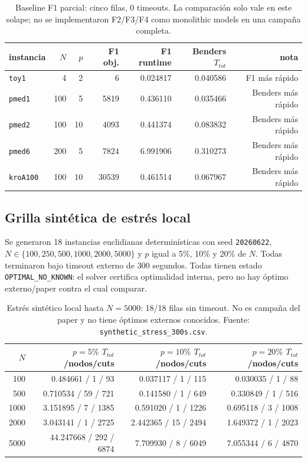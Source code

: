 \begin{table}[h]\centering\small
\begin{tabular}{lrrrrrr}
\toprule
instancia & $N$ & $p$ & F1 obj. & F1 runtime & Benders $T_{tot}$ & nota \\
\midrule
\texttt{toy1} & 4 & 2 & 6 & 0.024817 & 0.040586 & F1 más rápido \\
\texttt{pmed1} & 100 & 5 & 5819 & 0.436110 & 0.035466 & Benders más rápido \\
\texttt{pmed2} & 100 & 10 & 4093 & 0.441374 & 0.083832 & Benders más rápido \\
\texttt{pmed6} & 200 & 5 & 7824 & 6.991906 & 0.310273 & Benders más rápido \\
\texttt{kroA100} & 100 & 10 & 30539 & 0.461514 & 0.067967 & Benders más rápido \\
\bottomrule
\end{tabular}
\caption{Baseline F1 parcial: cinco filas, 0 timeouts. La comparación solo vale en este solape;
no se implementaron F2/F3/F4 como monolithic models en una campaña completa.}
\label{tab:f1baseline}
\end{table}

\subsection{Grilla sintética de estrés local}
Se generaron 18 instancias euclidianas determinísticas con seed \texttt{20260622},
$N\in\{100,250,500,1000,2000,5000\}$ y $p$ igual a 5\%, 10\% y 20\% de $N$. Todas terminaron bajo
timeout externo de 300 segundos. Todas tienen estado \texttt{OPTIMAL\_NO\_KNOWN}: el solver
certifica optimalidad interna, pero no hay óptimo externo/paper contra el cual comparar.

\begin{table}[h]\centering\small
\begin{tabular}{rrrr}
\toprule
$N$ & $p=5\%$ $T_{tot}$/nodos/cuts & $p=10\%$ $T_{tot}$/nodos/cuts & $p=20\%$ $T_{tot}$/nodos/cuts \\
\midrule
100 & 0.484661 / 1 / 93 & 0.037117 / 1 / 115 & 0.030035 / 1 / 88 \\
500 & 0.710534 / 59 / 721 & 0.141580 / 1 / 649 & 0.330849 / 1 / 516 \\
1000 & 3.151895 / 7 / 1385 & 0.591020 / 1 / 1226 & 0.695118 / 3 / 1008 \\
2000 & 3.043141 / 1 / 2725 & 2.442365 / 15 / 2494 & 1.649372 / 1 / 2023 \\
5000 & 44.247668 / 292 / 6874 & 7.709930 / 8 / 6049 & 7.055344 / 6 / 4870 \\
\bottomrule
\end{tabular}
\caption{Estrés sintético local hasta $N=5000$: 18/18 filas sin timeout. No es campaña del paper y
no tiene óptimos externos conocidos. Fuente: \texttt{synthetic\_stress\_300s.csv}.}
\label{tab:synthetic}
\end{table}


